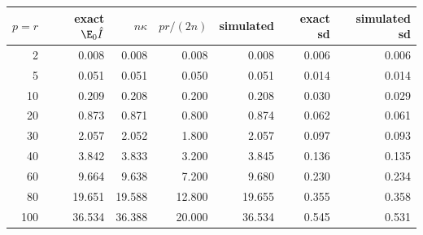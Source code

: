 \begin{tabular}{rrrrrrr}
\toprule
$p=r$ & exact $\E_0\hat I$ & $n\kappa$ & $pr/(2n)$ & simulated & exact sd & simulated sd\\
\midrule
2 & 0.008 & 0.008 & 0.008 & 0.008 & 0.006 & 0.006 \\
5 & 0.051 & 0.051 & 0.050 & 0.051 & 0.014 & 0.014 \\
10 & 0.209 & 0.208 & 0.200 & 0.208 & 0.030 & 0.029 \\
20 & 0.873 & 0.871 & 0.800 & 0.874 & 0.062 & 0.061 \\
30 & 2.057 & 2.052 & 1.800 & 2.057 & 0.097 & 0.093 \\
40 & 3.842 & 3.833 & 3.200 & 3.845 & 0.136 & 0.135 \\
60 & 9.664 & 9.638 & 7.200 & 9.680 & 0.230 & 0.234 \\
80 & 19.651 & 19.588 & 12.800 & 19.655 & 0.355 & 0.358 \\
100 & 36.534 & 36.388 & 20.000 & 36.534 & 0.545 & 0.531 \\
\bottomrule
\end{tabular}
